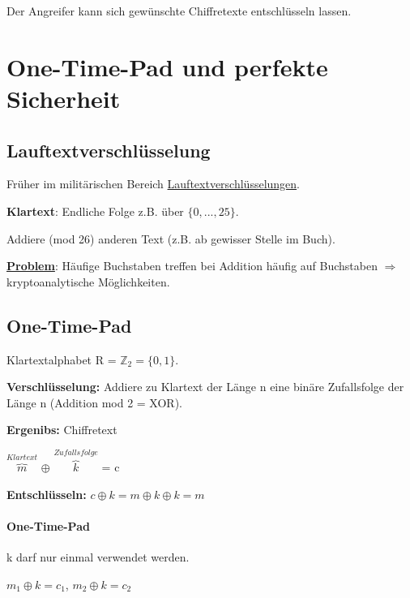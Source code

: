 Der Angreifer kann sich gewünschte Chiffretexte entschlüsseln lassen.


\chapter{One-Time-Pad und perfekte Sicherheit}

\section{Lauftextverschlüsselung}

Früher im militärischen Bereich \underline{Lauftextverschlüsselungen}.

\textbf{Klartext}: Endliche Folge z.B. über $\{0, ..., 25\}$.

Addiere (mod 26) anderen Text (z.B. ab gewisser Stelle im Buch).

\par \medskip

\textbf{\underline{Problem}}: Häufige Buchstaben treffen bei Addition häufig auf Buchstaben $\Rightarrow$ kryptoanalytische Möglichkeiten.

\section{One-Time-Pad}

Klartextalphabet R = $\mathbb{Z}_2 =  \{0, 1\}$. 

\par \medskip

\textbf{Verschlüsselung:} Addiere zu Klartext der Länge n eine binäre Zufallsfolge der Länge n (Addition mod 2 = XOR).

\par \medskip

\textbf{Ergenibs:} Chiffretext
\par \medskip


$\overbrace{m}^{Klartext}$ $\oplus$ $\overbrace{k}^{Zufallsfolge}$ = c

\par \medskip

\textbf{Entschlüsseln:} $c \oplus k = m \oplus k \oplus k = m$

\subsubsection{One-Time-Pad}
k darf nur einmal verwendet werden. 

$m_1  \oplus k = c_1$, $m_2 \oplus k = c_2$

